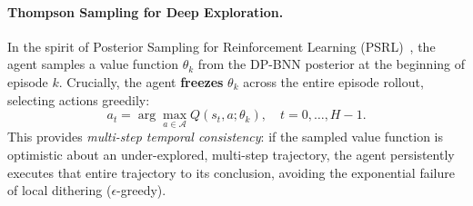 \documentclass[10pt]{article}
\begin{document}
\paragraph{Thompson Sampling for Deep Exploration.}
In the spirit of Posterior Sampling for Reinforcement Learning (PSRL)~\citep{strens2000bayesian, osband2013more}, the agent samples a value function $\theta_k$ from the DP-BNN posterior at the beginning of episode $k$. Crucially, the agent \textbf{freezes} $\theta_k$ across the entire episode rollout, selecting actions greedily:
\begin{equation}
a_t = \arg\max_{a \in \mathcal{A}} Q(s_t, a; \theta_k), \quad t = 0, \dots, H-1.
\end{equation}
This provides \emph{multi-step temporal consistency}: if the sampled value function is optimistic about an under-explored, multi-step trajectory, the agent persistently executes that entire trajectory to its conclusion, avoiding the exponential failure of local dithering ($\epsilon$-greedy).
\end{document}

